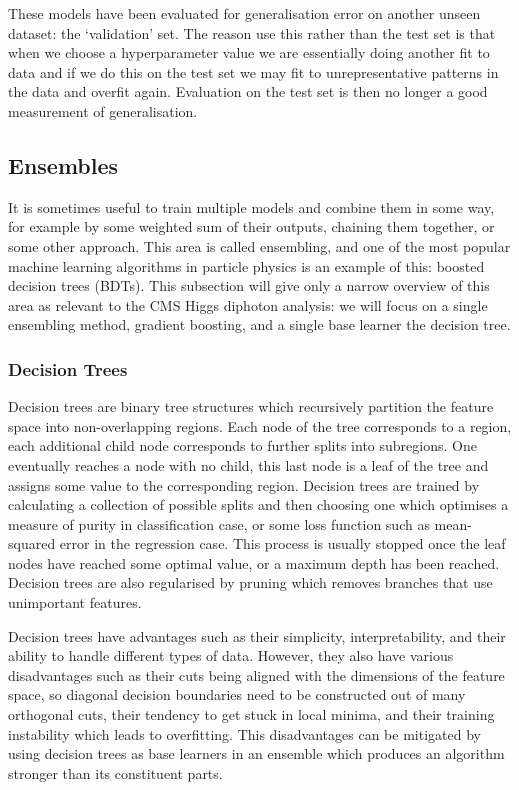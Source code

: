 These models have been evaluated for generalisation error on another unseen dataset: the `validation' set. The reason use this rather than the test set is that when we choose a hyperparameter value we are essentially doing another fit to data and if we do this on the test set we may fit to unrepresentative patterns in the data and overfit again. Evaluation on the test set is then no longer a good measurement of generalisation. 








\subsection{Ensembles}

It is sometimes useful to train multiple models and combine them in some way, for example by some weighted sum of their outputs, chaining them together, or some other approach. This area is called ensembling, and one of the most popular machine learning algorithms in particle physics is an example of this: boosted decision trees (BDTs). This subsection will give only a narrow overview of this area as relevant to the CMS Higgs diphoton analysis: we will focus on a single ensembling method, gradient boosting, and a single base learner the decision tree.


\subsubsection{Decision Trees}
Decision trees are binary tree structures which recursively partition the feature space into non-overlapping regions. Each node of the tree corresponds to a region, each additional child node corresponds to further splits into subregions. One eventually reaches a node with no child, this last node is a leaf of the tree and assigns some value to the corresponding region.  
Decision trees are trained by calculating a collection of possible splits and then choosing one which optimises a measure of purity in classification case, or some loss function such as mean-squared error in the regression case. This process is usually stopped once the leaf nodes have reached some optimal value, or a maximum depth has been reached. 
Decision trees are also regularised by pruning which removes branches that use unimportant features. 

Decision trees have advantages such as their simplicity, interpretability, and their ability to handle different types of data. However, they also have various disadvantages such as their cuts being aligned with the dimensions of the feature space, so diagonal decision boundaries need to be constructed out of many orthogonal cuts, their tendency to get stuck in local minima, and their training instability which leads to overfitting. This disadvantages can be mitigated by using decision trees as base learners in an ensemble which produces an algorithm stronger than its constituent parts. 

